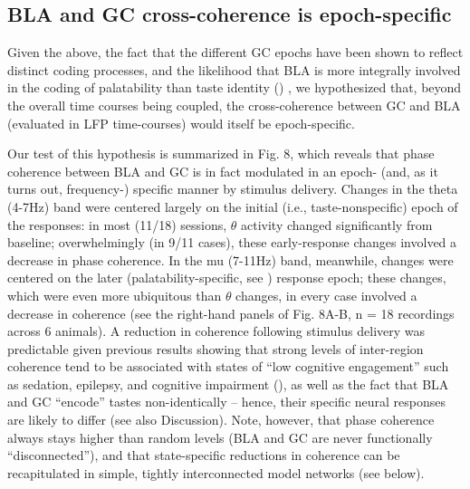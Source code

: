 \begin{refsection}
\subsection{BLA and GC cross-coherence is epoch-specific}
Given the above, the fact that the different GC epochs have been shown to reflect distinct coding processes, and the likelihood that BLA is more integrally involved in the coding of palatability than taste identity (\cite{piette2012a,lin2021a}) , we hypothesized that, beyond the overall time courses being coupled, the cross-coherence between GC and BLA (evaluated in LFP time-courses) would itself be epoch-specific. 

Our test of this hypothesis is summarized in Fig. 8, which reveals that phase coherence between BLA and GC is in fact modulated in an epoch- (and, as it turns out, frequency-) specific manner by stimulus delivery. Changes in the theta (4-7Hz) band were centered largely on the initial (i.e., taste-nonspecific) epoch of the responses: in most (11/18) sessions, \(\theta\) activity changed significantly from baseline; overwhelmingly (in 9/11 cases), these early-response changes involved a decrease in phase coherence. In the mu (7-11Hz) band, meanwhile, changes were centered on the later (palatability-specific, see \cite{katz2001a,sadacca2012a}) response epoch; these changes, which were even more ubiquitous than \(\theta\) changes, in every case involved a decrease in coherence (see the right-hand panels of Fig. 8A-B, n = 18 recordings across 6 animals). A reduction in coherence following stimulus delivery was predictable given previous results showing that strong levels of inter-region coherence tend to be associated with states of “low cognitive engagement” such as sedation, epilepsy, and cognitive impairment (\cite{supp2011a,martinet2017a,arbab2018a}), as well as the fact that BLA and GC “encode” tastes non-identically – hence, their specific neural responses are likely to differ (see also Discussion). Note, however, that phase coherence always stays higher than random levels (BLA and GC are never functionally “disconnected”), and that state-specific reductions in coherence can be recapitulated in simple, tightly interconnected model networks (see below). 


\end{refsection}
